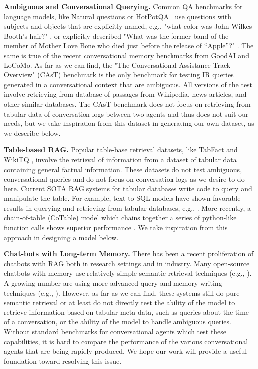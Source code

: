 \documentclass{article}
\begin{document}
\textbf{Ambiguous and Conversational Querying.} Common QA benchmarks for language models, like Natural questions \cite{kwiatkowski2019natural} or HotPotQA \cite{yang2018hotpotqa}, use questions with subjects and objects that are explicitly named, e.g., "what color was John Wilkes Booth's hair?" \cite{kwiatkowski2019natural}, or explicitly described "What was the former band of the member of Mother
Love Bone who died just before the release of “Apple”?" \cite{yang2018hotpotqa}. The same is true of the recent conversational memory benchmarks from GoodAI and LoCoMo. As far as we can find, the "The Conversational Assistance Track Overview" (CAsT) benchmark \cite{dalton2020trec, dalton2021cast} is the only benchmark for testing IR queries generated in a conversational context that are ambiguous. All versions of the test involve retrieving from database of passages from Wikipedia, news articles, and other similar databases. The CAsT benchmark does not focus on retrieving from tabular data of conversation logs between two agents and thus does not suit our needs, but we take inspiration from this dataset in generating our own dataset, as we describe below.

\textbf{Table-based RAG.} Popular table-base retrieval datasets, like TabFact \cite{chen2019tabfact} and WikiTQ \cite{pasupat2015compositional}, involve the retrieval of information from a dataset of tabular data containing general factual information. These datasets do not test ambiguous, conversational queries and do not focus on conversation logs as we desire to do here. Current SOTA RAG systems for tabular databases write code to query and manipulate the table. For example, text-to-SQL models have shown favorable results in querying and retrieving from tabular databases, e.g., \cite{cheng2022bindingsql, ye2023datersql}. More recently, a chain-of-table (CoTable) model which chains together a series of python-like function calls shows superior performance \cite{wang2024chain}. We take inspiration from this approach in designing a model below.

\textbf{Chat-bots with Long-term Memory.} There has been a recent proliferation of chatbots with RAG both in research settings and in industry. Many open-source chatbots with memory use relatively simple semantic retrieval techniques (e.g., \cite{jang2023conversation, maharana2024evaluating, zhong2024memorybank, lee2023prompted, lu2023memochat, wu2023brief}). A growing number are using more advanced query and memory writing techniques (e.g., \cite{lu2023memochat, maharana2024evaluating, goodai_benchmark2023}). However, as far as we can find, these systems still do pure semantic retrieval or at least do not directly test the ability of the model to retrieve information based on tabular meta-data, such as queries about the time of a conversation, or the ability of the model to handle ambiguous queries. Without standard benchmarks for conversational agents which test these capabilities, it is hard to compare the performance of the various conversational agents that are being rapidly produced. We hope our work will provide a useful foundation toward resolving this issue.
\end{document}
